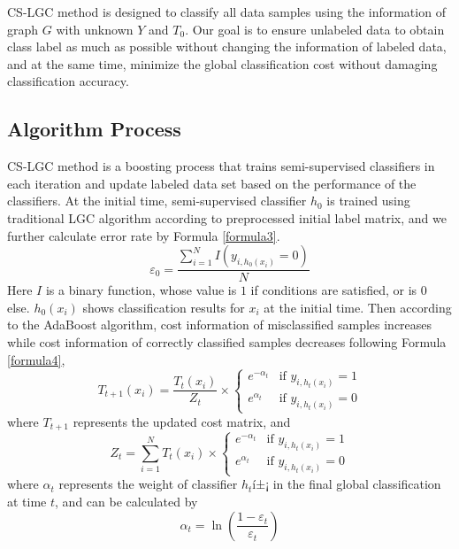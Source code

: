 \documentclass{svjour3}                     %
\begin{document}
CS-LGC method is designed to classify all data samples using the information of graph $G$ with unknown $Y$ and ${T_0}$. Our goal is to ensure unlabeled data to obtain class label as much as
possible without changing the information of labeled data, and at the same time, minimize the global  classification cost without damaging classification accuracy.
\subsection{Algorithm Process}
CS-LGC method is a boosting process that trains semi-supervised classifiers in each iteration and update labeled data set based on the performance of the classifiers.
At the initial time, semi-supervised classifier $h_0$ is trained using traditional LGC algorithm
according to preprocessed initial label matrix, and we further calculate error rate by Formula \ref{formula3}.
\begin{equation} \label{formula3}
  {\varepsilon _0} = \frac{{\mathop \sum \nolimits_{i = 1}^N I\left( {{y_{i,{h_0}\left( {{x_i}} \right)}} = 0} \right)}}{N}
\end{equation}
Here $I$ is a binary function, whose value is $1$ if conditions are satisfied, or is 0 else. ${h_0}\left( {{x_i}} \right)$ shows classification results for $x_i$ at the initial time. Then according to the AdaBoost algorithm, cost information of misclassified samples increases while cost information of correctly classified samples decreases following Formula \ref{formula4},
\begin{equation} \label{formula4}
  {T_{t + 1}}\left( {{x_i}} \right) = \frac{{{T_t}\left( {{x_i}} \right)}}{{{Z_t}}} \times 
  \begin{cases}
    {{e^{ - {\alpha_t}}}} & \text{if } {{y_{i,{h_t}\left( {{x_i}} \right)}} = 1} \\
    {{e^{{\alpha_t}}}} & \text{if } {{y_{i,{h_t}\left( {{x_i}} \right)}} = 0}
  \end{cases}
\end{equation}
where ${T_{t + 1}}$ represents the updated cost matrix, and
\begin{equation}
  {Z_t} = \mathop \sum \limits_{i = 1}^N {T_t}\left( {{x_i}} \right) \times 
  \begin{cases}
     {{e^{ - {\alpha_t}}}} & \text{if } {{y_{i,{h_t}\left( {{x_i}} \right)}} = 1} \\
     {{e^{{\alpha_t}}}} & \text{if } {{y_{i,{h_t}\left( {{x_i}} \right)}} = 0}   
  \end{cases}
\end{equation}
where ${\alpha _t}$ represents the weight of classifier $h_t$í±¡ in the final global classification at time $t$, and can be calculated by
\begin{equation}
  {\alpha _t} = \ln \left( {\frac{{1 - {\varepsilon _t}}}{{{\varepsilon _t}}}} \right)
\end{equation}
\end{document}
